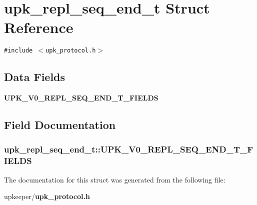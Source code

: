\section{upk\_\-repl\_\-seq\_\-end\_\-t Struct Reference}
\label{structupk__repl__seq__end__t}
{\tt \#include $<$upk\_\-protocol.h$>$}

\subsection*{Data Fields}
\begin{CompactItemize}
\item 
\bf{UPK\_\-V0\_\-REPL\_\-SEQ\_\-END\_\-T\_\-FIELDS}
\end{CompactItemize}


\subsection{Field Documentation}
\subsubsection{\setlength{\rightskip}{0pt plus 5cm}\bf{upk\_\-repl\_\-seq\_\-end\_\-t::UPK\_\-V0\_\-REPL\_\-SEQ\_\-END\_\-T\_\-FIELDS}}\label{structupk__repl__seq__end__t_a9a7589ac85fad8275dcedf979e5f166}




The documentation for this struct was generated from the following file:\begin{CompactItemize}
\item 
upkeeper/\bf{upk\_\-protocol.h}\end{CompactItemize}
